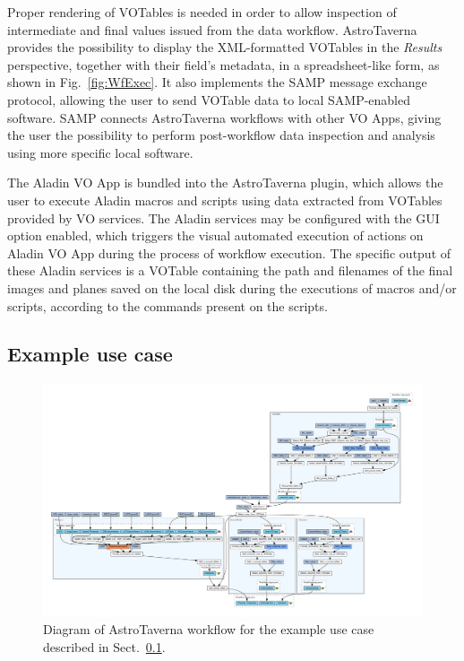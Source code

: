 \documentclass[final,authoryear,5p,times,twocolumn]{elsarticle}
\begin{document}
Proper rendering of VOTables is needed in order to allow inspection of intermediate and final values issued from the data workflow. AstroTaverna provides the possibility to display the XML-formatted VOTables in the \emph{Results} perspective, together with their field’s metadata, in a spreadsheet-like form, as shown in Fig.~\ref{fig:WfExec}. It also implements the SAMP message exchange protocol, allowing the user to send VOTable data to local SAMP-enabled software. SAMP connects AstroTaverna workflows with other VO Apps, giving the user the possibility to perform post-workflow data inspection and analysis using more specific local software.

The Aladin VO App is bundled into the AstroTaverna plugin, which allows the user to execute Aladin macros and scripts using data extracted from VOTables provided by VO services. The Aladin services may be configured with the GUI option enabled, which triggers the visual automated execution of actions on Aladin VO App during the process of workflow execution. The specific output of these Aladin services is a VOTable containing the path and filenames of the final images and planes saved on the local disk during the executions of macros and/or scripts, according to the commands present on the scripts.

\subsection{Example use case}
\label{Usecase}

\begin{figure}[tb]
\centering 
\includegraphics[width=17cm]{WfDiagram.pdf}
\caption{Diagram of AstroTaverna workflow for the example use case described in Sect.~\ref{Usecase}.}
\label{fig:WfDiagram}
\end{figure}
\end{document}
